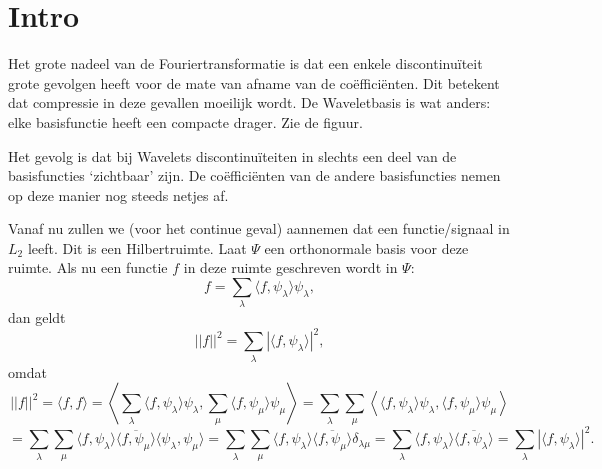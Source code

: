 \documentclass[11pt]{amsart}
\begin{document}
\section{Intro}
Het grote nadeel van de Fouriertransformatie is dat een enkele discontinu\"iteit grote gevolgen heeft voor de mate van afname van de co\"effici\"enten. Dit betekent dat compressie in deze gevallen moeilijk wordt. De Waveletbasis is wat anders: elke basisfunctie heeft een compacte drager. Zie de figuur.
\begin{figure}[h]
\end{figure}

Het gevolg is dat bij Wavelets discontinu\"iteiten in slechts een deel van de basisfuncties `zichtbaar' zijn. De co\"effici\"enten van de andere basisfuncties nemen op deze manier nog steeds netjes af.

Vanaf nu zullen we (voor het continue geval) aannemen dat een functie/signaal in $L_2$ leeft. Dit is een Hilbertruimte. Laat $\Psi$ een orthonormale basis voor deze ruimte. Als nu een functie $f$ in deze ruimte geschreven wordt in $\Psi$:
\[
f = \sum_{\lambda} \langle f, \psi_\lambda \rangle \psi_\lambda,
\]
dan geldt
\[
||f||^2 = \sum_{\lambda} | \langle f, \psi_\lambda \rangle |^2,
\]
omdat
\[
||f||^2 = \langle f, f \rangle = \left\langle \sum_{\lambda} \langle f, \psi_\lambda \rangle \psi_\lambda, \sum_{\mu} \langle f, \psi_\mu \rangle \psi_\mu \right\rangle = \sum_{\lambda} \sum_{\mu} \left\langle \langle f, \psi_\lambda \rangle \psi_\lambda, \langle f, \psi_\mu \rangle \psi_\mu \right \rangle
\]
\[
 = \sum_\lambda \sum_\mu \langle f, \psi_\lambda \rangle \overline{\langle f, \psi_\mu \rangle}\langle \psi_\lambda, \psi_\mu \rangle = \sum_\lambda \sum_\mu \langle f, \psi_\lambda \rangle \overline{\langle f, \psi_\mu \rangle} \delta_{\lambda \mu} = \sum_\lambda \langle f, \psi_\lambda \rangle \overline{\langle f, \psi_\lambda \rangle} = \sum_\lambda |\langle f, \psi_\lambda \rangle |^2.
\]
\end{document}

